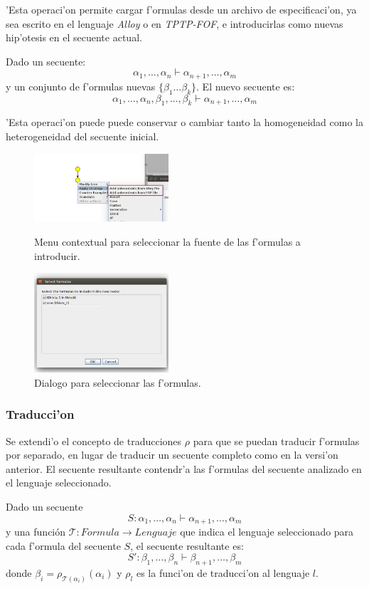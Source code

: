 'Esta operaci'on permite cargar f'ormulas desde un archivo de especificaci'on, ya sea escrito en el lenguaje \textit{Alloy} o en \textit{TPTP-FOF}, e introducirlas como nuevas hip'otesis en el secuente actual.

Dado un secuente:
$$ \alpha_1,\ldots,\alpha_n \vdash \alpha_{n+1},\ldots,\alpha_m $$
y un conjunto de f'ormulas nuevas $\{\beta_1 \ldots \beta_k\}$. El nuevo secuente es:
$$ \alpha_1,\ldots,\alpha_n,\beta_1,\ldots, \beta_k \vdash \alpha_{n+1},\ldots,\alpha_m $$

'Esta operaci'on puede puede conservar o cambiar tanto la homogeneidad como la heterogeneidad del secuente inicial.

\begin{figure}
\centering
\parbox{5cm}{
\includegraphics[width=5cm]{img/add_antecedents_1.png}	
\caption{Menu contextual para seleccionar la fuente de las f'ormulas a introducir.}}
\qquad
\begin{minipage}{5cm}
\includegraphics[width=5cm]{img/add_antecedents_2.png}
\caption{Dialogo para seleccionar las f'ormulas.}
\end{minipage}	
\end{figure}


\subsubsection{Traducci'on}

Se extendi'o el concepto de traducciones $\rho$ para que se puedan traducir f'ormulas por separado, en lugar de traducir un secuente completo como en la versi'on anterior.
El secuente resultante contendr'a las f'ormulas del secuente analizado en el lenguaje seleccionado.

Dado un secuente $$ S: \alpha_1,\ldots,\alpha_n \vdash \alpha_{n+1},\ldots,\alpha_m $$
y una función  $\mathcal{T}:Formula\rightarrow Lenguaje$ que indica el lenguaje seleccionado para cada f'ormula del secuente $S$, el secuente resultante es:
$$ S': \beta_1,\ldots,\beta_n \vdash \beta_{n+1},\ldots,\beta_m $$
donde $\beta_{i} = \rho_{\mathcal{T}(\alpha_i)}(\alpha_i)$ y $\rho_l$ es la funci'on de traducci'on al lenguaje $l$.

